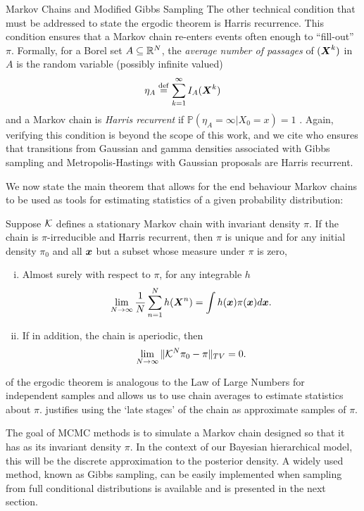 \begin{chapter}{Markov Chains and Modified Gibbs Sampling}
The other technical condition that must be addressed to state the ergodic theorem is Harris recurrence. 
This condition ensures that a Markov chain re-enters events often enough to ``fill-out'' $\pi$. 
Formally, for a Borel set $A\subseteq \mathbb R^N$, the \emph{average number of passages} of $(\mbox{\boldmath$X$}^k)$ in $A$ is the random variable (possibly infinite valued)
\begin{equation}
  \eta_A\stackrel{\rm def}{=} \sum_{k=1}^\infty I_A(\mbox{\boldmath$X$}^k)
\end{equation}
and a Markov chain is \emph{Harris recurrent} if $\mathbb P(\eta_A = \infty|X_0=x) =1$ \citep{robert2013monte}. 
Again, verifying this condition is beyond the scope of this work, and we cite \citep{liu2008monte} who ensures that transitions from Gaussian and gamma densities associated with Gibbs sampling and Metropolis-Hastings with Gaussian proposals are Harris recurrent.

We now state the main theorem that allows for the end behaviour Markov chains to be used as tools for estimating statistics of a given probability distribution:
\begin{thm} \label{thm:ergodicTheorem}
  \citep{tierney1994markov} Suppose $\mathcal K$ defines a stationary Markov chain with invariant density $\pi$. If the chain is $\pi$-irreducible and Harris recurrent, then $\pi$ is unique and for any initial density $\pi_0$ and all $\mbox{\boldmath$x$}$ but a subset whose measure under $\pi$ is zero,
  \begin{enumerate}[(i)]
    \item Almost surely with respect to $\pi$, for any integrable $h$ \begin{equation} \lim_{N\to \infty}\frac 1N\sum_{n=1}^N h(\mbox{\boldmath$X$}^n) = \int h(\mbox{\boldmath$x$}) \pi(\mbox{\boldmath$x$}) d\mbox{\boldmath$x$}. \label{eq:ergodicStat}\end{equation}
    \item If in addition, the chain is aperiodic, then \begin{equation} \lim_{N\to \infty}\|\mathcal K^N\pi_0 - \pi\|_{TV} = 0. \label{eq:ergodicDist}\end{equation}
  \end{enumerate}
\end{thm}
 of the ergodic theorem is analogous to the Law of Large Numbers for independent samples and allows us to use chain averages to estimate statistics about $\pi$.  
 justifies using the `late stages' of the chain as approximate samples of $\pi$.

The goal of MCMC methods is to simulate a Markov chain designed so that it has as its invariant density $\pi$.  
In the context of our Bayesian hierarchical model, this will be the discrete approximation to the posterior density.
A widely used method, known as Gibbs sampling, can be easily implemented when sampling from full conditional distributions is available and is presented in the next section.


\end{chapter}
